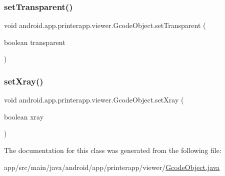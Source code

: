\subsubsection{\texorpdfstring{set\+Transparent()}{setTransparent()}}
{\footnotesize\ttfamily void android.\+app.\+printerapp.\+viewer.\+Gcode\+Object.\+set\+Transparent (\begin{DoxyParamCaption}\item[{boolean}]{transparent }\end{DoxyParamCaption})}

\mbox{\label{classandroid_1_1app_1_1printerapp_1_1viewer_1_1_gcode_object_a0533caadc145d53c110bfa4190a14157}} 
\subsubsection{\texorpdfstring{set\+Xray()}{setXray()}}
{\footnotesize\ttfamily void android.\+app.\+printerapp.\+viewer.\+Gcode\+Object.\+set\+Xray (\begin{DoxyParamCaption}\item[{boolean}]{xray }\end{DoxyParamCaption})}



The documentation for this class was generated from the following file\+:\begin{DoxyCompactItemize}
\item 
app/src/main/java/android/app/printerapp/viewer/\hyperlink{_gcode_object_8java}{Gcode\+Object.\+java}\end{DoxyCompactItemize}
